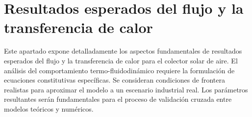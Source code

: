 \section{Resultados esperados del flujo y la transferencia de calor}
\label{sec:cap07_resultados_esperados}

Este apartado expone detalladamente los aspectos fundamentales de resultados esperados del flujo y la transferencia de calor para el colector solar de aire.
El análisis del comportamiento termo-fluidodinámico requiere la formulación de ecuaciones constitutivas específicas.
Se consideran condiciones de frontera realistas para aproximar el modelo a un escenario industrial real.
Los parámetros resultantes serán fundamentales para el proceso de validación cruzada entre modelos teóricos y numéricos.
